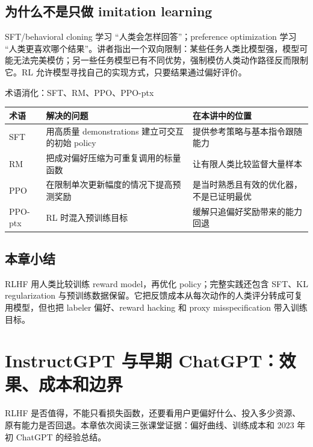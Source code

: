 \documentclass[a4paper]{article}
\begin{document}
\subsection{为什么不是只做 imitation learning}

SFT/behavioral cloning 学习 ``人类会怎样回答''；preference optimization 学习 ``人类更喜欢哪个结果''。讲者指出一个双向限制：某些任务人类比模型强，模型可能无法完美模仿；另一些任务模型已有不同优势，强制模仿人类动作路径反而限制它。RL 允许模型寻找自己的实现方式，只要结果通过偏好评价。

\begin{knowledgebox}{术语消化：SFT、RM、PPO、PPO-ptx}
\begin{tabularx}{\textwidth}{L{2.2cm} >{\raggedright\arraybackslash}X >{\raggedright\arraybackslash}X}
\toprule
术语 & 解决的问题 & 在本讲中的位置 \\
\midrule
SFT & 用高质量 demonstrations 建立可交互的初始 policy & 提供参考策略与基本指令跟随能力 \\
RM & 把成对偏好压缩为可重复调用的标量函数 & 让有限人类比较监督大量样本 \\
PPO & 在限制单次更新幅度的情况下提高预测奖励 & 是当时熟悉且有效的优化器，不是已证明最优 \\
PPO-ptx & RL 时混入预训练目标 & 缓解只追偏好奖励带来的能力回退 \\
\bottomrule
\end{tabularx}
\end{knowledgebox}


\subsection{本章小结}

RLHF 用人类比较训练 reward model，再优化 policy；完整实践还包含 SFT、KL regularization 与预训练数据保留。它把反馈成本从每次动作的人类评分转成可复用模型，但也把 labeler 偏好、reward hacking 和 proxy misspecification 带入训练目标。

\section{InstructGPT 与早期 ChatGPT：效果、成本和边界}

RLHF 是否值得，不能只看损失函数，还要看用户更偏好什么、投入多少资源、原有能力是否回退。本章依次阅读三张课堂证据：偏好曲线、训练成本和 2023 年初 ChatGPT 的经验总结。
\end{document}

